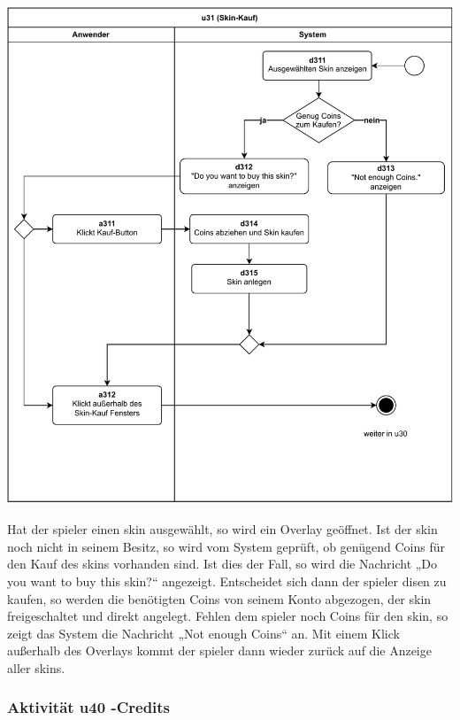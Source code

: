 \includegraphics[width=\linewidth]{diagramme/pdf/UML-Activity-u31.pdf}
\label{fig:dia:skinPurchase}
\vspace*{0.5cm}

Hat der \gls{spieler} einen \gls{skin} ausgewählt, so wird ein Overlay geöffnet. Ist der \gls{skin} noch nicht in seinem Besitz, so wird vom System geprüft, ob genügend Coins für den Kauf des \gls{skin}s vorhanden sind. Ist dies der Fall, so wird die Nachricht „Do you want to buy this skin?“ angezeigt. Entscheidet sich dann der \gls{spieler} disen zu kaufen, so werden die benötigten Coins von seinem Konto abgezogen, der \gls{skin} freigeschaltet und direkt angelegt. 
Fehlen dem \gls{spieler} noch Coins für den \gls{skin}, so zeigt das System die Nachricht „Not enough Coins“ an. Mit einem Klick außerhalb des Overlays kommt der \gls{spieler} dann wieder zurück auf die Anzeige aller \gls{skin}s.

\clearpage

\subsubsection{Aktivität u40 -Credits}


